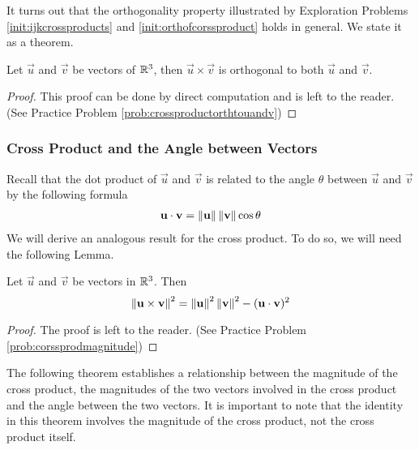\documentclass{ximera}
\begin{document}
It turns out that the orthogonality property illustrated by Exploration Problems \ref{init:ijkcrossproducts} and \ref{init:orthofcorssproduct}  holds in general.  We state it as a theorem.

\begin{theorem}\label{th:crossproductorthtouandv}
Let $\vec{u}$ and $\vec{v}$ be vectors of $\mathbb{R}^3$, then $\vec{u}\times\vec{v}$ is orthogonal to both $\vec{u}$ and $\vec{v}$.
\end{theorem}
\begin{proof}This proof can be done by direct computation and is left to the reader.  (See Practice Problem \ref{prob:crossproductorthtouandv})
\end{proof}

\subsubsection*{Cross Product and the Angle between Vectors}
Recall that the dot product of $\vec{u}$ and $\vec{v}$ is related to the angle $\theta$ between $\vec{u}$ and $\vec{v}$ by the following formula
\begin{align}\label{eq:dotproductformula}\mathbf{u}\cdot\mathbf{v}=\left\lVert\mathbf{u}\right\rVert\left\lVert\mathbf{v}\right\rVert\cos\theta\end{align}
We will derive an analogous result for the cross product.  To do so, we will need the following Lemma.

\begin{lemma}\label{lemma:crossprodmagnitude}
Let $\vec{u}$ and $\vec{v}$ be vectors in $\mathbb{R}^3$.  Then
$$\left\lVert\mathbf{u}\times\mathbf{v}\right\rVert^2=\left\lVert\mathbf{u}\right\rVert^2\left\lVert\mathbf{v}\right\rVert^2-(\mathbf{u}\cdot\mathbf{v})^2$$
\end{lemma}
\begin{proof} The proof is left to the reader.  (See Practice Problem \ref{prob:corssprodmagnitude})
\end{proof}

The following theorem establishes a relationship between the magnitude of the cross product, the magnitudes of the two vectors involved in the cross product and the angle between the two vectors.  It is important to note that  the identity in this theorem involves the magnitude of the cross product, not the cross product itself.
\end{document}
